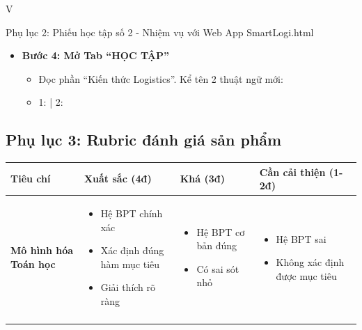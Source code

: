 \documentclass[12pt,a4paper]{article}
\begin{document}
\begin{competitionsection}{V}
\begin{phieuhoc_tap_box}{Phụ lục 2: Phiếu học tập số 2 - Nhiệm vụ với Web App SmartLogi.html}
\begin{itemize}[leftmargin=*,noitemsep]
\item \textbf{Bước 4: Mở Tab ``HỌC TẬP''}
    \begin{itemize}
    \item Đọc phần ``Kiến thức Logistics''. Kể tên 2 thuật ngữ mới:
    \item 1: \underline{\hspace{4cm}} | 2: \underline{\hspace{4cm}}
    \end{itemize}
\end{itemize}
\end{phieuhoc_tap_box}

\newpage
\subsection*{Phụ lục 3: Rubric đánh giá sản phẩm}
\begin{tabularx}{\linewidth}{@{} >{\raggedright\arraybackslash}p{3.2cm} >{\raggedright\arraybackslash}X >{\raggedright\arraybackslash}X >{\raggedright\arraybackslash}X @{}}
    \toprule
    \rowcolor{TableHeader}
    \sffamily\bfseries Tiêu chí & \sffamily\bfseries Xuất sắc (4đ) & \sffamily\bfseries Khá (3đ) & \sffamily\bfseries Cần cải thiện (1-2đ) \\
    \midrule
    
    \textbf{Mô hình hóa Toán học} 
    & 
    \begin{itemize}[leftmargin=*,noitemsep,topsep=1ex]
        \item Hệ BPT chính xác
        \item Xác định đúng hàm mục tiêu
        \item Giải thích rõ ràng
    \end{itemize}
    & 
    \begin{itemize}[leftmargin=*,noitemsep,topsep=1ex]
        \item Hệ BPT cơ bản đúng
        \item Có sai sót nhỏ
    \end{itemize}
    & 
    \begin{itemize}[leftmargin=*,noitemsep,topsep=1ex]
        \item Hệ BPT sai
        \item Không xác định được mục tiêu
    \end{itemize} \\
    \addlinespace
    

\end{tabularx}
\end{competitionsection}
\end{document}
